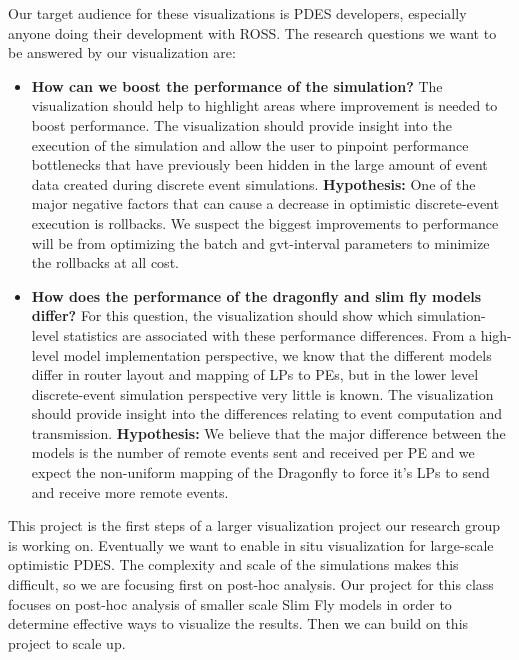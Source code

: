 \documentclass{acm_proc_article-sp}
\begin{document}
Our target audience for these visualizations is PDES developers, especially anyone doing their development with ROSS.  The research questions we want to be answered by our visualization are:
\begin{itemize}
\item \textbf{How can we boost the performance of the simulation?} The visualization should help to highlight areas where improvement is needed to boost performance. The visualization should provide insight into the execution of the simulation and allow the user to pinpoint performance bottlenecks that have previously been hidden in the large amount of event data created during discrete event simulations. \textbf{Hypothesis:} One of the major negative factors that can cause a decrease in optimistic discrete-event execution is rollbacks. We suspect the biggest improvements to performance will be from optimizing the batch and gvt-interval parameters to minimize the rollbacks at all cost.
\item  \textbf{How does the performance of the dragonfly and slim fly models differ?}  For this question, the visualization should show which simulation-level statistics are associated with these performance differences. From a high-level model implementation perspective, we know that the different models differ in router layout and mapping of LPs to PEs, but in the lower level discrete-event simulation perspective very little is known. The visualization should provide insight into the differences relating to event computation and transmission. \textbf{Hypothesis:} We believe that the major difference between the models is the number of remote events sent and received per PE and we expect the non-uniform mapping of the Dragonfly to force it's LPs to send and receive more remote events.
\end{itemize}

This project is the first steps of a larger visualization project our research group is working on.  Eventually we want to enable in situ visualization for large-scale optimistic PDES.  The complexity and scale of the simulations makes this difficult, so we are focusing first on post-hoc analysis.  Our project for this class focuses on post-hoc analysis of smaller scale Slim Fly models in order to determine effective ways to visualize the results.   Then we can build on this project to scale up.
\end{document}
